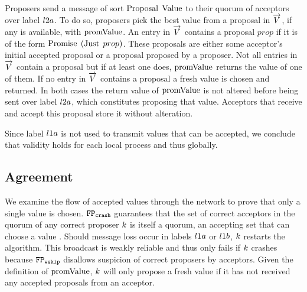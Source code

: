 Proposers send a message of sort $\operatorname{Proposal}\; \operatorname{Value}$ to their quorum of acceptors over label $l2a$.
To do so, proposers pick the best value from a proposal in $\overrightarrow{V}$, if any is available, with $\operatorname{promValue}$.
An entry in $\overrightarrow{V}$ contains a proposal $prop$ if it is of the form $\operatorname{Promise}\; \left(\operatorname{Just}\; prop\right)$.
These proposals are either some acceptor's initial accepted proposal or a proposal proposed by a proposer.
Not all entries in $\overrightarrow{V}$ contain a proposal but if at least one does, $\operatorname{promValue}$ returns the value of one of them.
If no entry in $\overrightarrow{V}$ contains a proposal a fresh value is chosen and returned.
In both cases the return value of $\operatorname{promValue}$ is not altered before being sent over label $l2a$, which constitutes proposing that value.
Acceptors that receive and accept this proposal store it without alteration.

Since label $l1a$ is not used to transmit values that can be accepted, we conclude that validity holds for each local process and thus globally.

\subsection{Agreement}
We examine the flow of accepted values through the network to prove that only a single value is chosen.
$\mathtt{FP_{crash}}$ guarantees that the set of correct acceptors in the quorum of any correct proposer $k$ is itself a quorum, \ie an accepting set that can choose a value \cite{Lamport06}.
Should message loss occur in labels $l1a$ or $l1b$, $k$ restarts the algorithm.
This broadcast is weakly reliable and thus only fails if $k$ crashes because $\mathtt{FP_{wskip}}$ disallows suspicion of correct proposers by acceptors.
Given the definition of $\operatorname{promValue}$, $k$ will only propose a fresh value if it has not received any accepted proposals from an acceptor.

